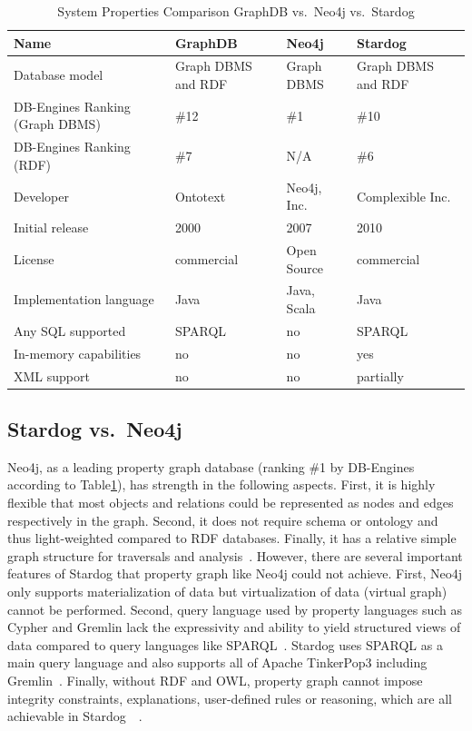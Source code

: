 \begin{table}[htb]
	\centering
	\caption{System Properties Comparison GraphDB vs.\ Neo4j vs.\ 
	Stardog}\label{t:comparison}
	\begin{tabular}{llll}
	Name & GraphDB & Neo4j & Stardog \\
		\toprule
	Database model&	Graph DBMS and RDF & Graph DBMS & Graph DBMS and 
	RDF \\
	\midrule
	DB-Engines Ranking (Graph DBMS) &\#12 &\#1 &\#10\\
	\midrule
	DB-Engines Ranking (RDF) &\#7 &N/A &\#6\\
	\midrule
	Developer & Ontotext &	Neo4j, Inc.	& Complexible Inc.\\
	\midrule
	Initial release	&2000 &	2007&	2010\\
	\midrule
	License &	commercial &	Open Source &	commercial \\
	\midrule
	Implementation language &	Java &	Java, Scala &	Java\\
	\midrule
	Any SQL supported &	SPARQL &	no	& SPARQL \\
	\midrule
	In-memory capabilities&no &no &			yes\\
	\midrule
	XML support&	no	& no& 	partially\\
	\bottomrule
	\end{tabular}
\end{table}

\subsection{Stardog vs.\ Neo4j}
Neo4j, as a leading property graph database (ranking \#1 by DB-Engines 
according to Table\ref{t:comparison}), has strength in the following aspects. 
First, it is highly flexible that most objects and relations could be represented 
as nodes and edges respectively in the graph. Second, it does not require 
schema or ontology and thus light-weighted compared to RDF databases. 
Finally, it has a relative simple graph structure for traversals and 
analysis~\cite{hid-sp18-405-robinson2013graphdatabase-stardog}. However, 
there are several important features of Stardog that property graph like 
Neo4j could not achieve. First, Neo4j only supports materialization of data 
but virtualization of data (virtual graph) cannot be performed. Second, query 
language used by property languages such as Cypher and Gremlin lack the 
expressivity and ability to yield structured views of data compared to query 
languages like SPARQL~\cite{hid-sp18-405-angles2008expre-stardog}. 
Stardog uses SPARQL as a main query language and also supports all of 
Apache TinkerPop3 including 
Gremlin~\cite{hid-sp18-405-www-stardog-docs}. Finally, without RDF and 
OWL, property graph cannot impose integrity constraints, explanations, 
user-defined rules or reasoning, which are all achievable in 
Stardog~\cite{hid-sp18-405-www-stardog-dbengines-neo4j}~\cite{hid-sp18-405-www-stardog-docs}.
 
